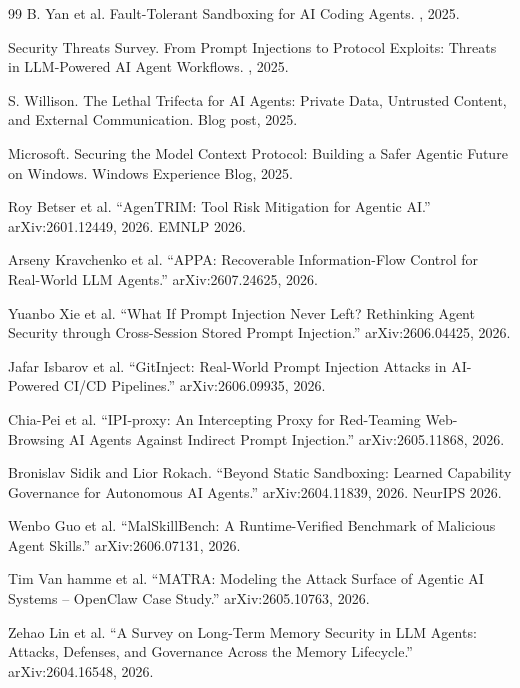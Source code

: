 \documentclass[11pt]{book}
\begin{document}
\begin{thebibliography}{99}
B. Yan et al.
\newblock Fault-Tolerant Sandboxing for AI Coding Agents.
, 2025.

Security Threats Survey.
\newblock From Prompt Injections to Protocol Exploits: Threats in LLM-Powered AI Agent Workflows.
, 2025.

S. Willison.
\newblock The Lethal Trifecta for AI Agents: Private Data, Untrusted Content, and External Communication.
\newblock Blog post, 2025.

Microsoft.
\newblock Securing the Model Context Protocol: Building a Safer Agentic Future on Windows.
\newblock Windows Experience Blog, 2025.


Roy Betser et al.
``AgenTRIM: Tool Risk Mitigation for Agentic AI.''
arXiv:2601.12449, 2026. EMNLP 2026.

Arseny Kravchenko et al.
``APPA: Recoverable Information-Flow Control for Real-World LLM Agents.''
arXiv:2607.24625, 2026.

Yuanbo Xie et al.
``What If Prompt Injection Never Left? Rethinking Agent Security through Cross-Session Stored Prompt Injection.''
arXiv:2606.04425, 2026.

Jafar Isbarov et al.
``GitInject: Real-World Prompt Injection Attacks in AI-Powered CI/CD Pipelines.''
arXiv:2606.09935, 2026.

Chia-Pei et al.
``IPI-proxy: An Intercepting Proxy for Red-Teaming Web-Browsing AI Agents Against Indirect Prompt Injection.''
arXiv:2605.11868, 2026.

Bronislav Sidik and Lior Rokach.
``Beyond Static Sandboxing: Learned Capability Governance for Autonomous AI Agents.''
arXiv:2604.11839, 2026. NeurIPS 2026.

Wenbo Guo et al.
``MalSkillBench: A Runtime-Verified Benchmark of Malicious Agent Skills.''
arXiv:2606.07131, 2026.

Tim Van hamme et al.
``MATRA: Modeling the Attack Surface of Agentic AI Systems -- OpenClaw Case Study.''
arXiv:2605.10763, 2026.

Zehao Lin et al.
``A Survey on Long-Term Memory Security in LLM Agents: Attacks, Defenses, and Governance Across the Memory Lifecycle.''
arXiv:2604.16548, 2026.


\end{thebibliography}
\end{document}
